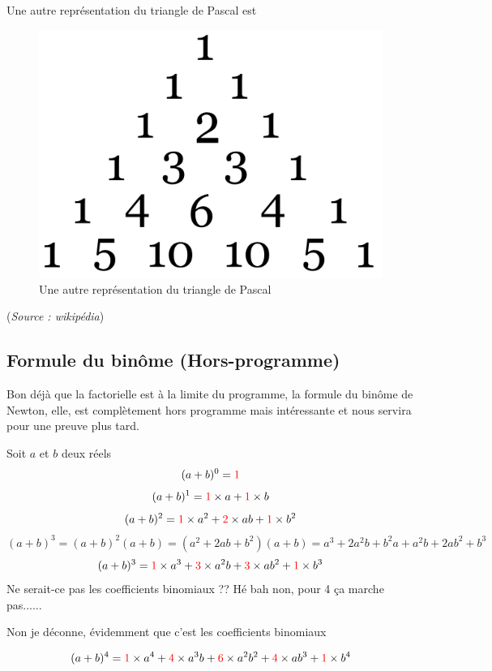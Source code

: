 Une autre représentation du triangle de Pascal est 
\begin{figure}[H]
\centering
\includegraphics[scale=0.4]{images/pascal2.png}
\caption{Une autre représentation du triangle de Pascal}
\end{figure}
(\emph{Source : wikipédia})\newline
\subsection{Formule du binôme (Hors-programme)}
Bon déjà que la factorielle est à la limite du programme, la formule du binôme de Newton, elle, est complètement hors programme mais intéressante et nous servira pour une preuve plus tard.\newline

Soit $a$ et $b$ deux réels
$$(a+b)^0 = {\color{red} 1}$$
$$(a+b)^1 = {\color{red} 1}\times a+  {\color{red} 1}\times b$$
$$(a+b)^2 = {\color{red} 1}\times a^2+  {\color{red} 2}\times ab + {\color{red} 1}\times b^2$$
$$(a+b)^3 = (a+b)^2(a+b) = (a^2 + 2ab + b^2)(a+b) = a^3 + 2a^2b + b^2a + a^2b + 2ab^2 + b^3$$
$$(a+b)^3 = {\color{red} 1}\times a^3 + {\color{red} 3}\times a^2b + {\color{red} 3}\times ab^2 + {\color{red} 1}\times b^3$$ 
Ne serait-ce pas les coefficients binomiaux ?? \newline
Hé bah non, pour 4 ça marche pas......\newline

Non je déconne, évidemment que c'est les coefficients binomiaux

$$(a+b)^4 = {\color{red} 1}\times a^4 + {\color{red} 4}\times a^3b + {\color{red} 6}\times a^2b^2 + {\color{red} 4}\times ab^3 + {\color{red} 1}\times b^4$$ 
\newline

